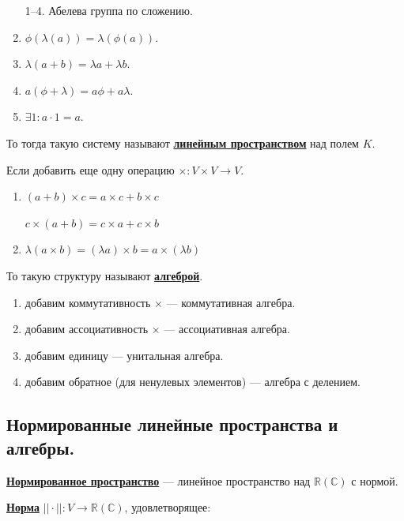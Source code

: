 \documentclass[twoside]{book}
\newcommand{\deff}[1]{\underline{\textbf{#1}}}
\begin{document}
\begin{enumerate}
    \item[1--4.] Абелева группа по сложению.
    \setcounter{enumi}{4}
    \item $ \phi(\lambda(a)) = \lambda(\phi(a))$.
    \item $\lambda (a+b) = \lambda a + \lambda b$.
    \item $a ( \phi + \lambda) = a\phi + a \lambda $.
    \item $\exists 1: a \cdot 1 =a$.
\end{enumerate}

То тогда такую систему называют \deff{линейным пространством} над полем $K$.

Если добавить еще одну операцию $\times: V \times V \rightarrow V$.

\begin{enumerate}[resume]
    \item $(a+b)\times c = a \times c + b \times c $

          $c\times (a+b) = c \times a + c \times b$

    \item $\lambda (a \times b) = (\lambda a )\times b = a \times (\lambda b)$
\end{enumerate}

То такую структуру называют \deff{алгеброй}.

\begin{enumerate}[resume]
    \item добавим коммутативность $\times$ --- коммутативная алгебра.

    \item добавим ассоциативность $\times$ --- ассоциативная алгебра.

    \item добавим единицу --- унитальная алгебра.

    \item добавим обратное (для ненулевых элементов) --- алгебра с делением.
\end{enumerate}

\subsection{Нормированные линейные пространства и алгебры.}

\deff{Нормированное пространство} --- линейное пространство над $\mathbb{R}(\mathbb{C})$ с нормой.

\deff{Норма} $||\cdot||:V \rightarrow \mathbb{R}(\mathbb{C})$, удовлетворящее:
\end{document}
